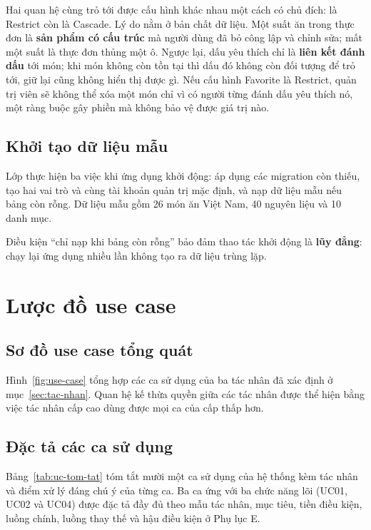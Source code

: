 Hai quan hệ cùng trỏ tới  được cấu hình khác nhau một cách có chủ
đích:  là Restrict còn  là Cascade. Lý do nằm ở
bản chất dữ liệu. Một suất ăn trong thực đơn là \textbf{sản phẩm có cấu trúc} mà
người dùng đã bỏ công lập và chỉnh sửa; mất một suất là thực đơn thủng một ô.
Ngược lại, dấu yêu thích chỉ là \textbf{liên kết đánh dấu} tới món; khi món không
còn tồn tại thì dấu đó không còn đối tượng để trỏ tới, giữ lại cũng không hiển
thị được gì. Nếu cấu hình Favorite là Restrict, quản trị viên sẽ không thể xóa
một món chỉ vì có người từng đánh dấu yêu thích nó, một ràng buộc gây phiền mà
không bảo vệ được giá trị nào.

\subsection{Khởi tạo dữ liệu mẫu}

Lớp  thực hiện ba việc khi ứng dụng khởi động: áp dụng các
migration còn thiếu, tạo hai vai trò  và  cùng tài khoản
quản trị mặc định, và nạp dữ liệu mẫu nếu bảng  còn rỗng. Dữ liệu
mẫu gồm 26 món ăn Việt Nam, 40 nguyên liệu và 10 danh mục.

Điều kiện ``chỉ nạp khi bảng còn rỗng'' bảo đảm thao tác khởi động là \textbf{lũy
đẳng}: chạy lại ứng dụng nhiều lần không tạo ra dữ liệu trùng lặp.

\section{Lược đồ use case}
\label{sec:use-case}

\subsection{Sơ đồ use case tổng quát}

Hình~\ref{fig:use-case} tổng hợp các ca sử dụng của ba tác nhân đã xác định ở
mục~\ref{sec:tac-nhan}. Quan hệ kế thừa quyền giữa các tác nhân được thể hiện
bằng việc tác nhân cấp cao dùng được mọi ca của cấp thấp hơn.



\subsection{Đặc tả các ca sử dụng}

Bảng~\ref{tab:uc-tom-tat} tóm tắt mười một ca sử dụng của hệ thống kèm tác nhân
và điểm xử lý đáng chú ý của từng ca. Ba ca ứng với ba chức năng lõi (UC01,
UC02 và UC04) được đặc tả đầy đủ theo mẫu tác nhân, mục tiêu, tiền điều kiện,
luồng chính, luồng thay thế và hậu điều kiện ở Phụ lục E.


